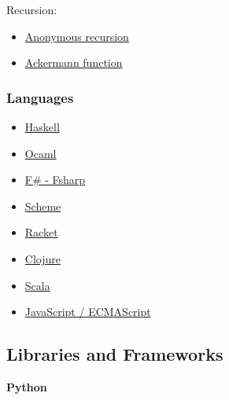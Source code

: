 \documentclass[11pt]{article}
\begin{document}
Recursion:

\begin{itemize}
\item \href{http://rosettacode.org/wiki/Anonymous_recursion}{Anonymous recursion}

\item \href{http://rosettacode.org/wiki/Ackermann_function}{Ackermann function}
\end{itemize}

\subsubsection{Languages}
\label{sec-4-2-2}

\begin{itemize}
\item \href{http://rosettacode.org/wiki/Haskell}{Haskell}

\item \href{http://rosettacode.org/wiki/OCaml}{Ocaml}

\item \href{http://rosettacode.org/wiki/Fsharp}{F\# - Fsharp}

\item \href{http://rosettacode.org/wiki/scheme}{Scheme}

\item \href{http://rosettacode.org/wiki/Racket}{Racket}

\item \href{http://rosettacode.org/wiki/Clojure}{Clojure}

\item \href{http://rosettacode.org/wiki/Scala}{Scala}

\item \href{http://rosettacode.org/wiki/Category:JavaScript}{JavaScript / ECMAScript}
\end{itemize}

\subsection{Libraries and Frameworks}
\label{sec-4-3}

\textbf{Python}
\end{document}
